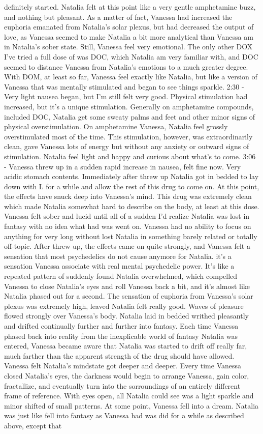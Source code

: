 \documentclass[12pt]{book}
\begin{document}
definitely started. Natalia felt at this point like a very gentle amphetamine buzz, and nothing but pleasant. As a matter of fact, Vanessa had increased the euphoria emanated from Natalia's solar plexus, but had decreased the output of love, as Vanessa seemed to make Natalia a bit more analytical than Vanessa am in Natalia's sober state. Still, Vanessa feel very emotional. The only other DOX I've tried a full dose of was DOC, which Natalia am very familiar with, and DOC seemed to distance Vanessa from Natalia's emotions to a much greater degree. With DOM, at least so far, Vanessa feel exactly like Natalia, but like a version of Vanessa that was mentally stimulated and began to see things sparkle. 2:30 - Very light nausea began, but I'm still felt very good. Physical stimulation had increased, but it's a unique stimulation. Generally on amphetamine compounds, included DOC, Natalia get some sweaty palms and feet and other minor signs of physical overstimulation. On amphetamine Vanessa, Natalia feel grossly overstimulated most of the time. This stimulation, however, was extraordinarily clean, gave Vanessa lots of energy but without any anxiety or outward signs of stimulation. Natalia feel light and happy and curious about what's to come. 3:06 - Vanessa threw up in a sudden rapid increase in nausea, felt fine now. Very acidic stomach contents. Immediately after threw up Natalia got in bedded to lay down with L for a while and allow the rest of this drug to come on. At this point, the effects have snuck deep into Vanessa's mind. This drug was extremely clean which made Natalia somewhat hard to describe on the body, at least at this dose. Vanessa felt sober and lucid until all of a sudden I'd realize Natalia was lost in fantasy with no idea what had was went on. Vanessa had no ability to focus on anything for very long without lost Natalia in something barely related or totally off-topic. After threw up, the effects came on quite strongly, and Vanessa felt a sensation that most psychedelics do not cause anymore for Natalia. it's a sensation Vanessa associate with real mental psychedelic power. It's like a repeated pattern of suddenly found Natalia overwhelmed, which compelled Vanessa to close Natalia's eyes and roll Vanessa back a bit, and it's almost like Natalia phased out for a second. The sensation of euphoria from Vanessa's solar plexus was extremely high, leaved Natalia felt really good. Waves of pleasure flowed strongly over Vanessa's body. Natalia laid in bedded writhed pleasantly and drifted continually further and further into fantasy. Each time Vanessa phased back into reality from the inexplicable world of fantasy Natalia was entered, Vanessa became aware that Natalia was started to drift off really far, much farther than the apparent strength of the drug should have allowed. Vanessa felt Natalia's mindstate got deeper and deeper. Every time Vanessa closed Natalia's eyes, the darkness would begin to arrange Vanessa, gain color, fractallize, and eventually turn into the sorroundings of an entirely different frame of reference. With eyes open, all Natalia could see was a light sparkle and minor shifted of small patterns. At some point, Vanessa fell into a dream. Natalia was just like fell into fantasy as Vanessa had was did for a while as described above, except that 
\end{document}
